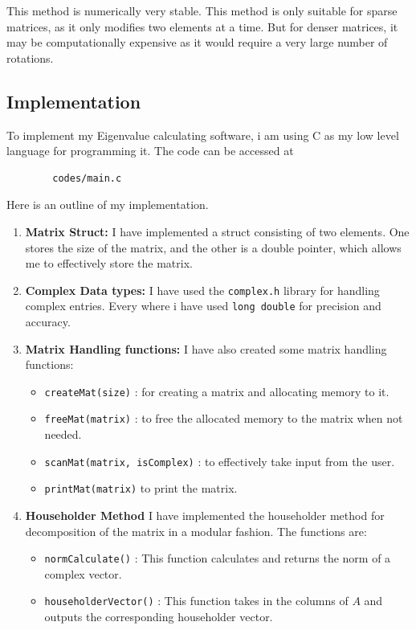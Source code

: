 \documentclass{article}
\begin{document}
This method is numerically very stable. This method is only suitable for sparse matrices, as it only modifies two elements at a time. But for denser matrices, it may be computationally expensive as it would require a very large number of rotations.

\subsection{Implementation}
To implement my Eigenvalue calculating software, i am using C as my low level language for programming it. The code can be accessed at
    \begin{lstlisting}
        codes/main.c
    \end{lstlisting} Here is an outline of my implementation.
\begin{enumerate}
    \item \textbf{Matrix Struct: } I have implemented a struct consisting of two elements. One stores the size of the matrix, and the other is a double pointer, which allows me to effectively store the matrix.
    \item \textbf{Complex Data types:} I have used the \texttt{complex.h} library for handling complex entries. Every where i have used \texttt{long double} for precision and accuracy.
    \item \textbf{Matrix Handling functions:} I have also created some matrix handling functions:
    \begin{itemize}
        \item \texttt{createMat(size)} : for creating a matrix and allocating memory to it.
        \item \texttt{freeMat(matrix)} : to free the allocated memory to the matrix when not needed.
        \item \texttt{scanMat(matrix, isComplex)} : to effectively take input from the user.
        \item \texttt{printMat(matrix)} to print the matrix.
    \end{itemize}
    \item \textbf{Householder Method} I have implemented the householder method for decomposition of the matrix in a modular fashion. The functions are:
    \begin{itemize}
        \item \texttt{normCalculate()} : This function calculates and returns the norm of a complex vector.
        \item \texttt{householderVector()} : This function takes in the columns of $A$ and outputs the corresponding householder vector.

\end{itemize}
\end{enumerate}
\end{document}
